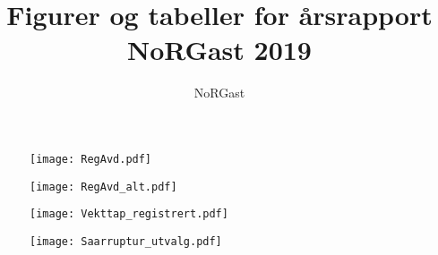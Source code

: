 \documentclass[norsk,a4paper]{article}\usepackage[]{graphicx}\usepackage[]{color}
\title{Figurer og tabeller for årsrapport NoRGast 2019}
\author{NoRGast}
\begin{document}
\maketitle


\clearpage





\begin{figure}[ht]
\centering
\texttt{[image: RegAvd.pdf]}
\caption{}
\end{figure}

\begin{figure}[ht]
\centering
\texttt{[image: RegAvd\_alt.pdf]}
\caption{}
\end{figure}

\begin{figure}[ht]
\centering
\texttt{[image: Vekttap\_registrert.pdf]}
\caption{}
\end{figure}




\begin{figure}[ht]
\centering
\texttt{[image: Saarruptur\_utvalg.pdf]}
\caption{}
\end{figure}


\clearpage
\end{document}
